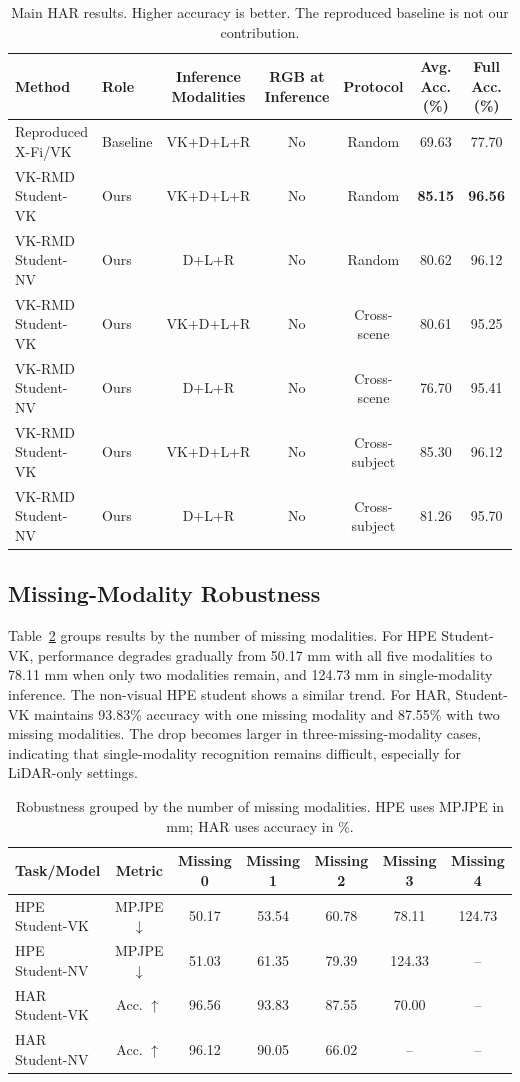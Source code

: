 \documentclass[journal]{IEEEtran}
\newcommand{\ours}{VK-RMD}
\newcommand{\mpjpe}{MPJPE}
\begin{document}
\begin{table}[t]
\centering
\caption{Main HAR results. Higher accuracy is better. The reproduced baseline is not our contribution.}
\label{tab:har_main}
\begin{tabular}{llccccc}
\toprule
Method & Role & Inference Modalities & RGB at Inference & Protocol & Avg. Acc. (\%) & Full Acc. (\%) \\
\midrule
Reproduced X-Fi/VK & Baseline & VK+D+L+R & No & Random & 69.63 & 77.70 \\
\ours{} Student-VK & Ours & VK+D+L+R & No & Random & \textbf{85.15} & \textbf{96.56} \\
\ours{} Student-NV & Ours & D+L+R & No & Random & 80.62 & 96.12 \\
\ours{} Student-VK & Ours & VK+D+L+R & No & Cross-scene & 80.61 & 95.25 \\
\ours{} Student-NV & Ours & D+L+R & No & Cross-scene & 76.70 & 95.41 \\
\ours{} Student-VK & Ours & VK+D+L+R & No & Cross-subject & 85.30 & 96.12 \\
\ours{} Student-NV & Ours & D+L+R & No & Cross-subject & 81.26 & 95.70 \\
\bottomrule
\end{tabular}
\end{table}

\subsection{Missing-Modality Robustness}

Table~\ref{tab:missing_group} groups results by the number of missing modalities. For HPE Student-VK, performance degrades gradually from 50.17 mm with all five modalities to 78.11 mm when only two modalities remain, and 124.73 mm in single-modality inference. The non-visual HPE student shows a similar trend. For HAR, Student-VK maintains 93.83\% accuracy with one missing modality and 87.55\% with two missing modalities. The drop becomes larger in three-missing-modality cases, indicating that single-modality recognition remains difficult, especially for LiDAR-only settings.

\begin{table}[t]
\centering
\caption{Robustness grouped by the number of missing modalities. HPE uses \mpjpe{} in mm; HAR uses accuracy in \%.}
\label{tab:missing_group}
\begin{tabular}{lcccccc}
\toprule
Task/Model & Metric & Missing 0 & Missing 1 & Missing 2 & Missing 3 & Missing 4 \\
\midrule
HPE Student-VK & \mpjpe{} $\downarrow$ & 50.17 & 53.54 & 60.78 & 78.11 & 124.73 \\
HPE Student-NV & \mpjpe{} $\downarrow$ & 51.03 & 61.35 & 79.39 & 124.33 & -- \\
HAR Student-VK & Acc. $\uparrow$ & 96.56 & 93.83 & 87.55 & 70.00 & -- \\
HAR Student-NV & Acc. $\uparrow$ & 96.12 & 90.05 & 66.02 & -- & -- \\
\bottomrule
\end{tabular}
\end{table}
\end{document}
